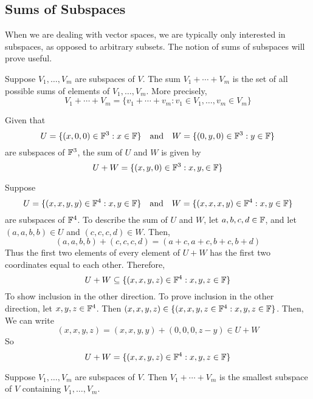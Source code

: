 \subsection*{Sums of Subspaces}
When we are dealing with vector spaces, we are typically only interested in subspaces, as opposed to arbitrary subsets. The notion of sums of subspaces will prove useful.
\begin{definition}
    Suppose $V_1, \dots, V_m$ are subspaces of $V$. The sum $V_1 + \cdots + V_m$ is the set of all possible sums of elements of $V_1, \dots, V_m$. More precisely,
    \[ V_1 + \cdots + V_m = \{ v_1 + \cdots + v_m : v_1\in V_1, \dots, v_m \in V_m \} \]
\end{definition}
\newpage
\begin{example}
    Given that
    \[ U = \{(x,0,0)\in \mathbb F^3 : x\in \mathbb F\} \quad\text{and}\quad W = \{(0,y,0)\in \mathbb F^3 : y\in \mathbb F \}\]
    are subspaces of $\mathbb F^3$, the sum of $U$ and $W$ is given by
    \[ U+W = \{(x,y,0)\in \mathbb F^3: x,y,\in \mathbb F\} \]
\end{example}
\begin{example}
    Suppose 
    \[ U = \{(x,x,y,y)\in \mathbb F^4: x,y\in \mathbb F\}\quad\text{and}\quad W = \{(x,x,x,y) \in \mathbb F^4: x,y\in \mathbb F\} \]
    are subspaces of $\mathbb F^4$. To describe the sum of $U$ and $W$, let $a,b,c,d\in \mathbb F$, and let $(a,a,b,b)\in U$ and $(c,c,c,d)\in W$. Then,
    \[ (a,a,b,b) + (c,c,c,d) = (a+c, a+c, b+c, b+d) \]
    Thus the first two elements of every element of $U+W$ has the first two coordinates equal to each other. Therefore,
    \[ U+W \subseteq  \{(x,x,y,z)\in \mathbb F^4: x,y,z\in\mathbb F\} \]
    To show inclusion in the other direction. To prove inclusion in the other direction, let $x,y,z\in \mathbb F^4$. Then $(x,x,y,z)\in \{(x,x,y,z\in \mathbb F^4 : x,y,z\in \mathbb F\}$. Then, We can write
    \[ (x,x,y,z) = (x,x,y,y) + (0,0,0,z-y) \in U+W\]
    So 
    \[ U+W = \{(x,x,y,z)\in\mathbb F^4 : x,y,z\in \mathbb F\} \]
\end{example}
\begin{theorem}
    Suppose $V_1, \dots, V_m$ are subspaces of $V$. Then $V_1 + \cdots + V_m$ is the smallest subspace of $V$ containing $V_1, \dots, V_m$.
\end{theorem}
